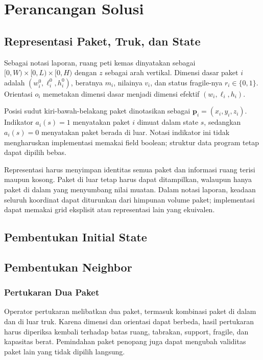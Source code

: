\documentclass[11pt,a4paper]{article}
\begin{document}
\section{Perancangan Solusi}
\par\pagebreak[0]

\subsection{Representasi Paket, Truk, dan State}
Sebagai notasi laporan, ruang peti kemas dinyatakan sebagai
$[0,W)\times[0,L)\times[0,H)$ dengan $z$ sebagai arah vertikal. Dimensi dasar
paket $i$ adalah $(w_i^0,\ell_i^0,h_i^0)$, beratnya $m_i$, nilainya $v_i$,
dan status fragile-nya $r_i\in\{0,1\}$. Orientasi $o_i$ memetakan dimensi dasar
menjadi dimensi efektif $(w_i,\ell_i,h_i)$.

Posisi sudut kiri-bawah-belakang paket dinotasikan sebagai
$\boldsymbol{p}_i=(x_i,y_i,z_i)$. Indikator $a_i(s)=1$ menyatakan paket $i$
dimuat dalam state $s$, sedangkan $a_i(s)=0$ menyatakan paket berada di luar.
Notasi indikator ini tidak mengharuskan implementasi memakai field boolean;
struktur data program tetap dapat dipilih bebas.

Representasi harus menyimpan identitas semua paket dan informasi ruang terisi
maupun kosong. Paket di luar tetap harus dapat ditampilkan, walaupun hanya
paket di dalam yang menyumbang nilai muatan. Dalam notasi laporan, keadaan
seluruh koordinat dapat diturunkan dari himpunan volume paket; implementasi
dapat memakai grid eksplisit atau representasi lain yang ekuivalen.


\subsection{Pembentukan Initial State}
\par\pagebreak[0]

\subsection{Pembentukan Neighbor}
\par\pagebreak[0]

\subsubsection{Pertukaran Dua Paket}
Operator pertukaran melibatkan dua paket, termasuk kombinasi paket di dalam
dan di luar truk. Karena dimensi dan orientasi dapat berbeda, hasil pertukaran
harus diperiksa kembali terhadap batas ruang, tabrakan, support, fragile,
dan kapasitas berat. Pemindahan paket penopang juga dapat mengubah validitas
paket lain yang tidak dipilih langsung.
\end{document}
